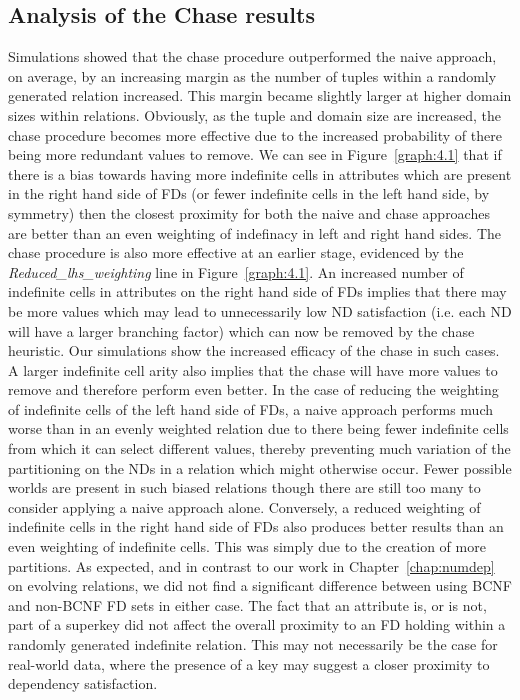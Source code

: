 \subsection{Analysis of the Chase results}\label{subsec:chase_res}
Simulations showed that the chase 
procedure outperformed
the naive approach, on average, by an increasing margin as the number of
tuples within a randomly generated relation increased. This margin became
slightly larger at higher domain sizes within relations. Obviously, as the
tuple and domain size are increased, the chase procedure becomes more 
effective due to the increased probability of there being more redundant 
values to remove. We can see in Figure~\ref{graph:4.1}
that if there is a bias towards having more indefinite cells in attributes
which are present in the right hand side of FDs (or fewer indefinite
cells in the left hand side, by symmetry) then
the closest proximity for both the naive and chase approaches are better
than an even weighting of indefinacy in left and right hand sides. The
chase procedure is also more effective 
at an earlier stage, evidenced by the {\em Reduced\_lhs\_weighting}
line in Figure~\ref{graph:4.1}. An increased number of indefinite
cells in attributes 
on the right hand side of FDs implies that there may be more values which
may lead to unnecessarily low ND satisfaction (i.e. each ND will have a 
larger branching factor) which can now be removed by the chase heuristic.
Our simulations show the increased efficacy of the chase in such cases.
A larger indefinite cell arity also implies that the chase will have more
values to remove and therefore perform even better. In the case of reducing
the weighting of indefinite cells of the left hand side of FDs, a naive
approach performs much worse than in an evenly weighted relation due to
there being fewer indefinite cells from which it can select different
values, thereby preventing much variation of the partitioning on the NDs 
in a relation which might otherwise occur. Fewer possible worlds are
present in such biased relations though there are still too many to
consider applying a naive approach alone.
Conversely, a reduced
weighting of indefinite cells in the right hand side of FDs also
produces better results than an even weighting of indefinite
cells. This was simply due to the creation of more partitions.
As expected, and in contrast to our work in Chapter~\ref{chap:numdep}
on evolving relations, we did not find a
significant difference between using BCNF and non-BCNF FD sets in
either case. The fact that an attribute is, or is not, part of a
superkey did not affect the overall proximity to an FD holding
within a randomly generated indefinite relation. This may not
necessarily be the case for real-world data, where the presence of a
key may suggest a closer proximity to dependency satisfaction.
\medskip

